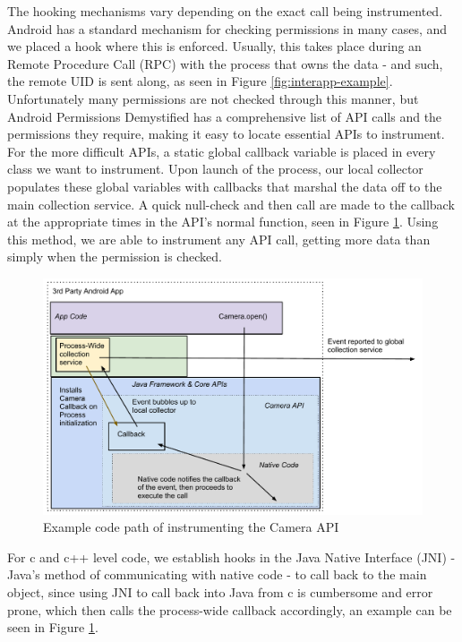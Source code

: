 The hooking mechanisms vary depending on the exact call being instrumented. Android has a standard mechanism for checking permissions in many cases, and we placed a hook where this is enforced. Usually, this takes place during an Remote Procedure Call (RPC) with the process that owns the data - and such, the remote UID is sent along, as seen in Figure \ref{fig:interapp-example}. Unfortunately many permissions are not checked through this manner, but Android Permissions Demystified\citep{felt2011android} has a comprehensive list of API calls and the permissions they require, making it easy to locate essential APIs to instrument. For the more difficult APIs, a static global callback variable is placed in every class we want to instrument. Upon launch of the process, our local collector populates these global variables with callbacks that marshal the data off to the main collection service. A quick null-check and then call are made to the callback at the appropriate times in the API's normal function, seen in Figure \ref{fig:camera-example}. Using this method, we are able to instrument any API call, getting more data than simply when the permission is checked.

\begin{figure}[t]
\begin{center}
\includegraphics[width=1.0\columnwidth]{figs/AndroMEDA-Static-Example}
\caption{Example code path of instrumenting the Camera API}
\label{fig:camera-example}
\end{center}
\end{figure}

For c and c++ level code, we establish hooks in the Java Native Interface (JNI) - Java's method of communicating with native code - to call back to the main object, since using JNI to call back into Java from c is cumbersome and error prone, which then calls the process-wide callback accordingly, an example can be seen in Figure \ref{fig:camera-example}.

